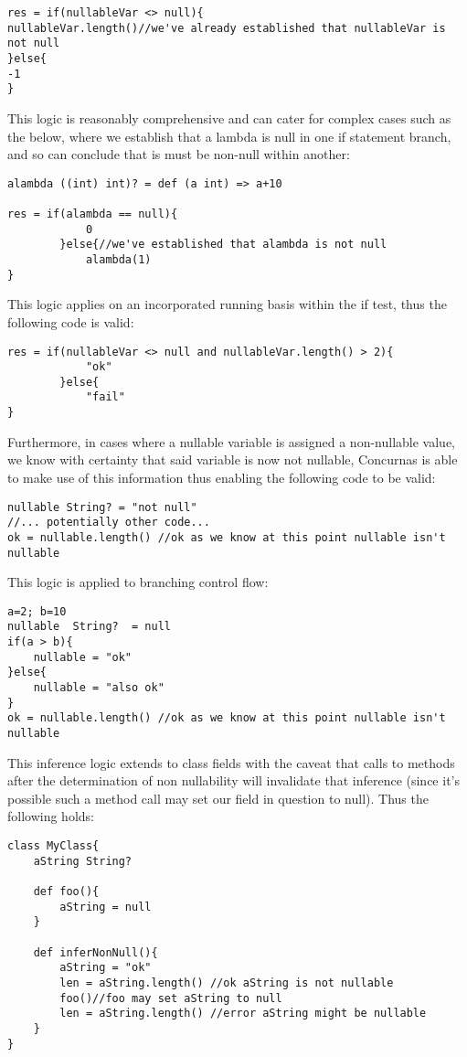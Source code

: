 \documentclass[conc-doc]{subfiles}
\begin{document}
\begin{lstlisting}
res = if(nullableVar <> null){
nullableVar.length()//we've already established that nullableVar is not null
}else{
-1
}
\end{lstlisting}

This logic is reasonably comprehensive and can cater for complex cases such as the below, where we establish that a lambda is null in one if statement branch, and so can conclude that is must be non-null within another:

\begin{lstlisting}
alambda ((int) int)? = def (a int) => a+10

res = if(alambda == null){
			0
		}else{//we've established that alambda is not null
			alambda(1)
}
\end{lstlisting}

This logic applies on an incorporated running basis within the if test, thus the following code is valid:

\begin{lstlisting}
res = if(nullableVar <> null and nullableVar.length() > 2){
			"ok"
		}else{
			"fail"
}
\end{lstlisting}


Furthermore, in cases where a nullable variable is assigned a non-nullable value, we know with certainty that said variable is now not nullable, Concurnas is able to make use of this information thus enabling the following code to be valid:

\begin{lstlisting}
nullable String? = "not null"
//... potentially other code...
ok = nullable.length() //ok as we know at this point nullable isn't nullable
\end{lstlisting}

This logic is applied to branching control flow:

\begin{lstlisting}
a=2; b=10
nullable  String?  = null
if(a > b){
	nullable = "ok"
}else{
	nullable = "also ok"
}
ok = nullable.length() //ok as we know at this point nullable isn't nullable
\end{lstlisting}

This inference logic extends to class fields with the caveat that calls to methods after the determination of non nullability will invalidate that inference (since it's possible such a method call may set our field in question to null). Thus the following holds:

\begin{lstlisting}
class MyClass{
	aString String?

	def foo(){ 
		aString = null
	}
	
	def inferNonNull(){
		aString = "ok"
		len = aString.length() //ok aString is not nullable
		foo()//foo may set aString to null
		len = aString.length() //error aString might be nullable
	}
}
\end{lstlisting}
\end{document}
